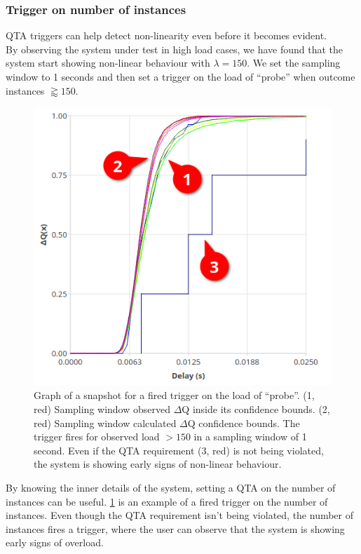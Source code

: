        \subsubsection{Trigger on number of instances}
        QTA triggers can help detect non-linearity even before it becomes evident.\\ 
        By observing the system under test in high load cases, we have found that the system start showing non-linear behaviour with $\lambda = 150$. We set the sampling window to 1 seconds and then set a trigger on the load of ``probe'' when outcome instances $\gtrapprox 150$.
        \begin{figure}[H]
            \begin{center}
                \includegraphics[scale=0.5]{img/overload_2/fired_samplea.png}
            \end{center}
            \caption{Graph of a snapshot for a fired trigger on the load of ``probe''. (1, red) Sampling window observed $\Delta$Q inside its confidence bounds. (2, red) Sampling window calculated $\Delta$Q confidence bounds. The trigger fires for observed load $> 150$ in a sampling window of 1 second. Even if the QTA requirement (3, red) is not being violated, the system is showing early signs of non-linear behaviour.}%
            \label{fig:qta_trig}%
        \end{figure} 
        By knowing the inner details of the system, setting a QTA on the number of instances can be useful. \cref{fig:qta_trig} is an example of a fired trigger on the number of instances. Even though the QTA requirement isn't being violated, the number of instances fires a trigger, where the user can observe that the system is showing early signs of overload.

